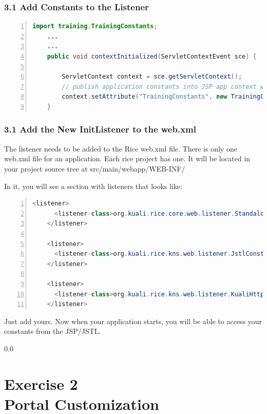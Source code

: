 \subsubsection*{3.1 Add Constants to the Listener}
\begin{lstlisting}[basicstyle=\scriptsize,numbers=left,language=java,backgroundcolor=\color{ubergray},caption={training/web/TrainingFunctions},frame=single,breaklines=true]
    import training.TrainingConstants;
    ...
    ...
    public void contextInitialized(ServletContextEvent sce) {

        ServletContext context = sce.getServletContext();
        // publish application constants into JSP app context with name "Constants"
        context.setAttribute("TrainingConstants", new TrainingConstants());
    }
\end{lstlisting}

\subsubsection*{3.1 Add the New InitListener to the web.xml}
The listener needs to be added to the Rice web.xml file. There is only
one web.xml file for an application. Each rice project has one. It
will be located in your project source tree at
src/main/webapp/WEB-INF/
 
In it, you will see a section with listeners that looks like:
\begin{lstlisting}[basicstyle=\scriptsize,numbers=left,language=java,backgroundcolor=\color{ubergray},caption={src/main/webapp/WEB-INF/web.xml},frame=single,breaklines=true]
    <listener>
      <listener-class>org.kuali.rice.core.web.listener.StandaloneInitializeListener</listener-class>
    </listener>

    <listener>
      <listener-class>org.kuali.rice.kns.web.listener.JstlConstantsInitListener</listener-class>
    </listener>

    <listener>
      <listener-class>org.kuali.rice.kns.web.listener.KualiHttpSessionListener</listener-class>
    </listener>
\end{lstlisting}

Just add yours. Now when your application starts, you will be able to
access your constants from the JSP/JSTL.

{\setlength{\baselineskip}%
  {0.0\baselineskip}
  \section*{\flushright Exercise 2\\Portal Customization}
  \hrulefill \par}

